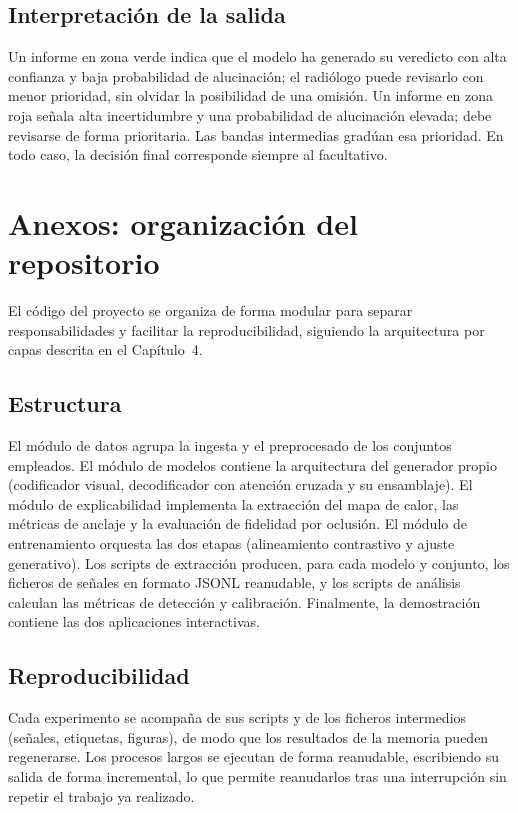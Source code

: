 \documentclass[12pt,a4paper]{report}
\begin{document}
\section{Interpretación de la salida}
Un informe en zona verde indica que el modelo ha generado su veredicto con alta confianza y
baja probabilidad de alucinación; el radiólogo puede revisarlo con menor prioridad, sin olvidar la
posibilidad de una omisión. Un informe en zona roja señala alta incertidumbre y una
probabilidad de alucinación elevada; debe revisarse de forma prioritaria. Las bandas intermedias
gradúan esa prioridad. En todo caso, la decisión final corresponde siempre al facultativo.

\chapter{Anexos: organización del repositorio}

El código del proyecto se organiza de forma modular para separar responsabilidades y facilitar la
reproducibilidad, siguiendo la arquitectura por capas descrita en el Capítulo~4.

\section{Estructura}
El módulo de datos agrupa la ingesta y el preprocesado de los conjuntos empleados. El módulo
de modelos contiene la arquitectura del generador propio (codificador visual, decodificador
con atención cruzada y su ensamblaje). El módulo de explicabilidad implementa la extracción
del mapa de calor, las métricas de anclaje y la evaluación de fidelidad por oclusión. El módulo de
entrenamiento orquesta las dos etapas (alineamiento contrastivo y ajuste generativo). Los
scripts de extracción producen, para cada modelo y conjunto, los ficheros de señales en
formato JSONL reanudable, y los scripts de análisis calculan las métricas de detección y calibración.
Finalmente, la demostración contiene las dos aplicaciones interactivas.

\section{Reproducibilidad}
Cada experimento se acompaña de sus scripts y de los ficheros intermedios (señales, etiquetas,
figuras), de modo que los resultados de la memoria pueden regenerarse. Los procesos largos se ejecutan
de forma reanudable, escribiendo su salida de forma incremental, lo que permite reanudarlos tras una
interrupción sin repetir el trabajo ya realizado.
\end{document}
